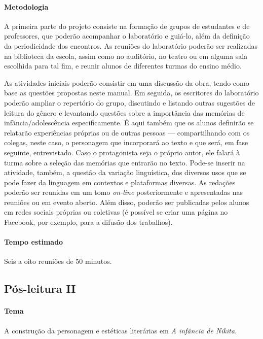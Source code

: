 \documentclass{article}
\begin{document}
\paragraph{Metodologia}
A primeira parte do projeto consiste na formação de grupos de estudantes
e de professores, que poderão acompanhar o laboratório e guiá-lo, além
da definição da periodicidade dos encontros. As reuniões do laboratório
poderão ser realizadas na biblioteca da escola, assim como no auditório,
no teatro ou em alguma sala escolhida para tal fim, e reunir alunos de
diferentes turmas do ensino médio.

As atividades iniciais poderão consistir em uma discussão da obra, tendo
como base as questões propostas neste manual. Em seguida, os escritores
do laboratório poderão ampliar o repertório do grupo, discutindo e
listando outras sugestões de leitura do gênero e levantando questões
sobre a importância das memórias de infância/adolescência
especificamente. É aqui também que os alunos definirão se relatarão
experiências próprias ou de outras pessoas --- compartilhando com os
colegas, neste caso, o personagem que incorporará ao texto e que será,
em fase seguinte, entrevistado. Caso o protagonista seja o próprio
autor, ele falará à turma sobre a seleção das memórias que entrarão no
texto. Pode-se inserir na atividade, também, a questão da variação
linguística, dos diversos usos que se pode fazer da linguagem em
contextos e plataformas diversas. As redações poderão ser reunidas em um
tomo \emph{on-line} posteriormente e apresentadas nas reuniões ou em
evento aberto. Além disso, poderão ser publicadas pelos alunos em redes
sociais próprias ou coletivas (é possível se criar uma página no
Facebook, por exemplo, para a difusão dos trabalhos).

\paragraph{Tempo estimado} Seis a oito reuniões de 50 minutos.

\subsection{Pós-leitura II}

\paragraph{Tema} A construção da personagem e estéticas literárias em \emph{A infância de Nikita}.
\end{document}
